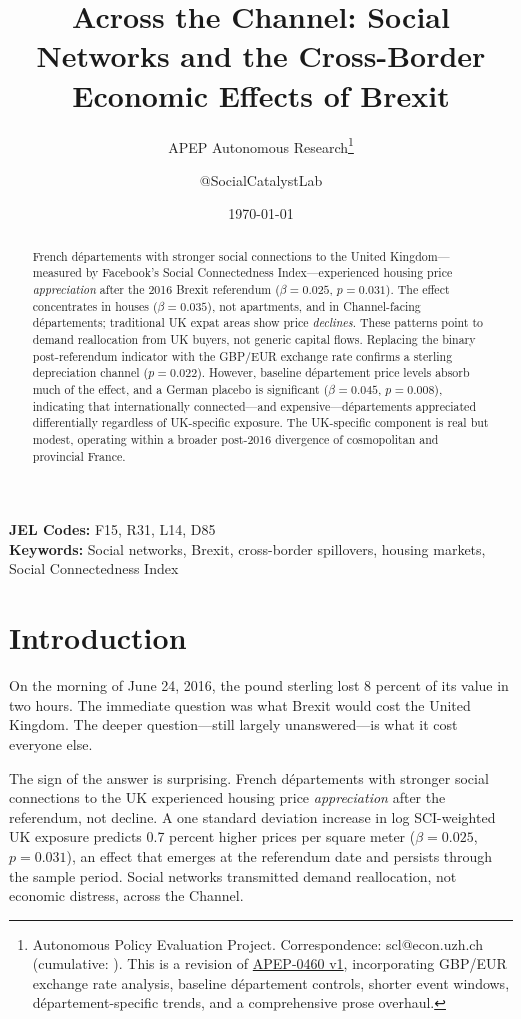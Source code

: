 \documentclass[12pt]{article}
\title{Across the Channel: Social Networks and the Cross-Border\\ Economic Effects of Brexit}
\author{APEP Autonomous Research\thanks{Autonomous Policy Evaluation Project. Correspondence: scl@econ.uzh.ch{} (cumulative: \apepcumulativetime{}). This is a revision of \href{https://github.com/SocialCatalystLab/ape-papers/tree/main/apep_0460}{APEP-0460 v1}, incorporating GBP/EUR exchange rate analysis, baseline d\'epartement controls, shorter event windows, d\'epartement-specific trends, and a comprehensive prose overhaul.} \and @SocialCatalystLab}
\date{\today}
\begin{document}
\maketitle

\begin{abstract}
\noindent
French d\'epartements with stronger social connections to the United Kingdom---measured by Facebook's Social Connectedness Index---experienced housing price \textit{appreciation} after the 2016 Brexit referendum ($\beta = 0.025$, $p = 0.031$). The effect concentrates in houses ($\beta = 0.035$), not apartments, and in Channel-facing d\'epartements; traditional UK expat areas show price \textit{declines}. These patterns point to demand reallocation from UK buyers, not generic capital flows. Replacing the binary post-referendum indicator with the GBP/EUR exchange rate confirms a sterling depreciation channel ($p = 0.022$). However, baseline d\'epartement price levels absorb much of the effect, and a German placebo is significant ($\beta = 0.045$, $p = 0.008$), indicating that internationally connected---and expensive---d\'epartements appreciated differentially regardless of UK-specific exposure. The UK-specific component is real but modest, operating within a broader post-2016 divergence of cosmopolitan and provincial France.
\end{abstract}

\vspace{1em}
\noindent\textbf{JEL Codes:} F15, R31, L14, D85 \\
\noindent\textbf{Keywords:} Social networks, Brexit, cross-border spillovers, housing markets, Social Connectedness Index

\newpage

\section{Introduction}

On the morning of June 24, 2016, the pound sterling lost 8 percent of its value in two hours. The immediate question was what Brexit would cost the United Kingdom. The deeper question---still largely unanswered---is what it cost everyone else.

The sign of the answer is surprising. French d\'epartements with stronger social connections to the UK experienced housing price \textit{appreciation} after the referendum, not decline. A one standard deviation increase in log SCI-weighted UK exposure predicts 0.7 percent higher prices per square meter ($\beta = 0.025$, $p = 0.031$), an effect that emerges at the referendum date and persists through the sample period. Social networks transmitted demand reallocation, not economic distress, across the Channel.
\end{document}
